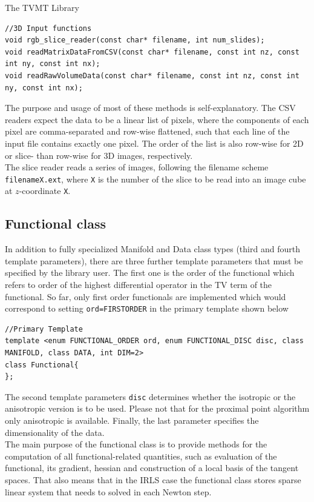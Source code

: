 \begin{chapter}{The TVMT Library}
\begin{lstlisting}
//3D Input functions
void rgb_slice_reader(const char* filename, int num_slides); 
void readMatrixDataFromCSV(const char* filename, const int nz, const int ny, const int nx);
void readRawVolumeData(const char* filename, const int nz, const int ny, const int nx);
\end{lstlisting}
The purpose and usage of most of these methods is self-explanatory. The CSV readers expect the data to be a linear list of pixels, where the components of each pixel are
comma-separated and row-wise flattened, such that each line of the input file contains exactly one pixel. The order of the list is also row-wise for 2D or slice- than row-wise for 3D images,
respectively. \\ 
The slice reader reads a series of images, following the filename scheme \texttt{filenameX.ext}, where \texttt{X} is the number of the slice to be read into an image cube at $z$-coordinate
\texttt{X}.

\subsection{Functional class} %
\label{sub:Functional class}
In addition to fully specialized Manifold and Data class types (third and fourth template parameters),
there are three further template parameters that must be specified by the library user. The first one
is the order of the functional which refers to order of the highest differential operator in the TV term of the functional.
So far, only first order functionals are implemented which would correspond to setting \texttt{ord=FIRSTORDER} in the primary template shown below

\cppinline
\begin{lstlisting}
//Primary Template
template <enum FUNCTIONAL_ORDER ord, enum FUNCTIONAL_DISC disc, class MANIFOLD, class DATA, int DIM=2>
class Functional{
};
\end{lstlisting}

The second template parameters \texttt{disc} determines whether the isotropic or the anisotropic version is to be used. Please not that for the proximal point algorithm only
anisotropic is available. Finally, the last parameter specifies the dimensionality of the data. \\
The main purpose of the functional class is to provide methods for the computation of all functional-related quantities, such as evaluation of the functional, its gradient,
hessian and construction of a local basis of the tangent spaces. That also means that in the IRLS case the functional class stores sparse linear system that needs to solved
in each Newton step.\\


\end{chapter}
